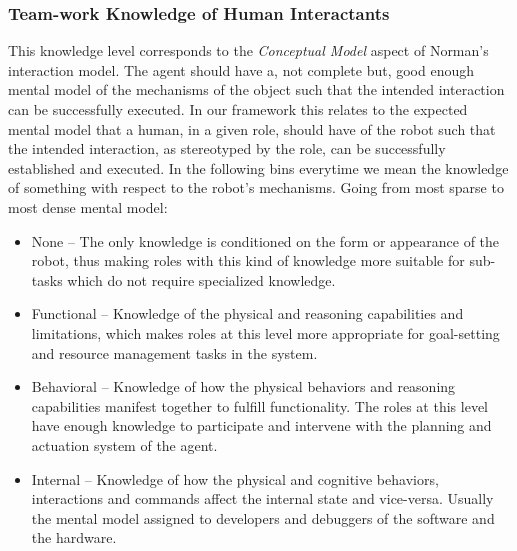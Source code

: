 \documentclass[letterpaper, 10 pt, conference]{ieeeconf} %
\begin{document}
\subsubsection{Team-work Knowledge of Human Interactants}
This knowledge level corresponds to the \textit{Conceptual Model} aspect of Norman's interaction
model. The agent should have a, not complete but, good enough mental model of the mechanisms of the
object such that the intended interaction can be successfully executed. In our framework this
relates to the expected mental model that a human, in a given role, should have of the robot such
that the intended interaction, as stereotyped by the role, can be successfully established and
executed. In the following bins everytime we mean the knowledge of something with respect to the
robot's mechanisms. Going from most sparse to most dense mental model:
\begin{itemize}{}
  \item None -- The only knowledge is conditioned on the form or appearance of the robot, thus
    making roles with this kind of knowledge more suitable for sub-tasks which do not require
    specialized knowledge.
  \item Functional -- Knowledge of the physical and reasoning capabilities and limitations, which
    makes roles at this level more appropriate for goal-setting and resource management tasks in the
    system.
  \item Behavioral -- Knowledge of how the physical behaviors and reasoning capabilities manifest
    together to fulfill functionality. The roles at this level have enough knowledge to participate
    and intervene with the planning and actuation system of the agent.
  \item Internal -- Knowledge of how the physical and cognitive behaviors, interactions and commands
    affect the internal state and vice-versa. Usually the mental model assigned to developers and
    debuggers of the software and the hardware.
\end{itemize}
\end{document}
